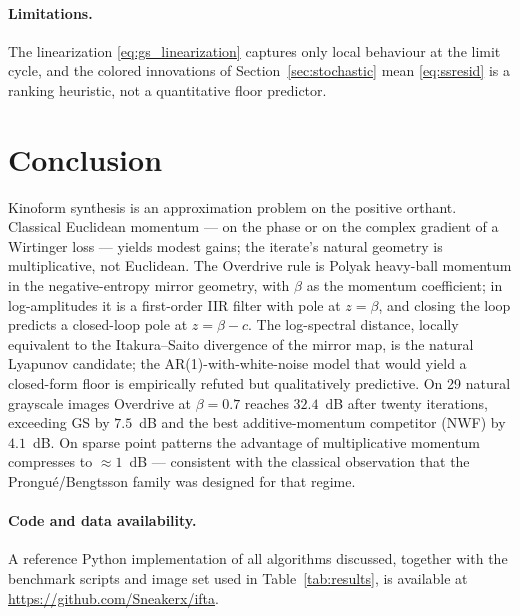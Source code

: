 \documentclass[11pt,a4paper]{article}
\begin{document}
\paragraph{Limitations.} The linearization \eqref{eq:gs_linearization}
captures only local behaviour at the limit cycle, and the colored
innovations of Section~\ref{sec:stochastic} mean \eqref{eq:ssresid} is a
ranking heuristic, not a quantitative floor predictor.

\section{Conclusion}\label{sec:conclusion}

Kinoform synthesis is an approximation problem on the positive orthant.
Classical Euclidean momentum --- on the phase or on the complex gradient
of a Wirtinger loss --- yields modest gains; the iterate's natural geometry
is multiplicative, not Euclidean. The Overdrive rule is Polyak heavy-ball
momentum in the negative-entropy mirror geometry, with $\beta$ as the
momentum coefficient; in log-amplitudes it is a first-order IIR filter
with pole at $z=\beta$, and closing the loop predicts a closed-loop pole
at $z=\beta-c$. The log-spectral distance, locally equivalent to the
Itakura--Saito divergence of the mirror map, is the natural Lyapunov
candidate; the AR(1)-with-white-noise model that would yield a closed-form
floor is empirically refuted but qualitatively predictive. On 29 natural
grayscale images Overdrive at $\beta=0.7$ reaches $32.4$~dB after twenty
iterations, exceeding GS by $7.5$~dB and the best additive-momentum
competitor (NWF) by $4.1$~dB. On sparse point patterns the advantage of
multiplicative momentum compresses to $\approx 1$~dB --- consistent with
the classical observation that the Prongu\'e/Bengtsson family was designed
for that regime.

\paragraph{Code and data availability.} A reference Python implementation of
all algorithms discussed, together with the benchmark scripts and image set
used in Table~\ref{tab:results}, is available at
\url{https://github.com/Sneakerx/ifta}.


\end{document}
